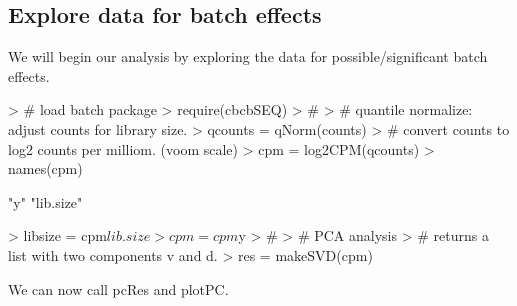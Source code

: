 \documentclass{article}
\begin{document}
\subsection{Explore data for batch effects}
We will begin our analysis by exploring the data for possible/significant batch effects.

\begin{Schunk}
\begin{Sinput}
> # load batch package
> require(cbcbSEQ)
> #
> # quantile normalize: adjust counts for library size.
> qcounts = qNorm(counts)
> # convert counts to log2 counts per milliom. (voom scale)
> cpm = log2CPM(qcounts)
> names(cpm)
\end{Sinput}
\begin{Soutput}
[1] "y"        "lib.size"
\end{Soutput}
\begin{Sinput}
> libsize = cpm$lib.size
> cpm = cpm$y
> #
> # PCA analysis
> # returns a list with two components v and d.
> res = makeSVD(cpm)
\end{Sinput}
\end{Schunk}
We can now call pcRes and plotPC.
\end{document}

